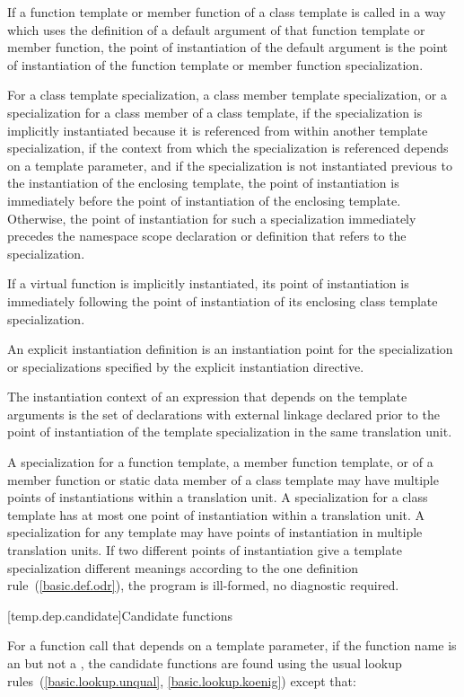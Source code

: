 \pnum
If a function template or member function of a class template is called
in a way which uses the definition of a default argument of that function
template or member function,
the point of instantiation of the default argument is the point of
instantiation of the function template or member function specialization.

\pnum
For a class template specialization, a class member template specialization,
or a specialization for a class member of a class template,
if the specialization is implicitly instantiated because it is referenced
from within another template specialization,
if the context from which the specialization is referenced depends on a
template parameter,
and if the specialization is not instantiated previous to the instantiation of
the enclosing template,
the point of instantiation is immediately before the point of instantiation of
the enclosing template.
Otherwise, the point of instantiation for such a specialization immediately
precedes the namespace scope declaration
or definition that refers to the specialization.

\pnum
If a virtual function is implicitly instantiated, its point of instantiation
is immediately following the point of instantiation of its enclosing class
template specialization.

\pnum
An explicit instantiation definition is an instantiation
point for the specialization or specializations specified by the explicit
instantiation directive.

\pnum
The instantiation context of an expression that depends on the template
arguments is the set of declarations with external linkage declared prior to the
point of instantiation of the template specialization in the same translation
unit.

\pnum
A specialization for a function template, a member function template,
or of a member function or static data member of a class template may have
multiple points of instantiations within a translation unit.
A specialization for a class template has at most one point of instantiation
within a translation unit.
A specialization for any template may have points of instantiation in multiple
translation units.
If two different points of instantiation give a template specialization
different meanings according to the one definition rule~(\ref{basic.def.odr}),
the program is ill-formed, no diagnostic required.

[temp.dep.candidate]{Candidate functions}

\pnum
{}%
For a function call that depends on a template parameter,
if the function name is an  but not a
, the candidate functions are found using the
usual lookup rules~(\ref{basic.lookup.unqual}, \ref{basic.lookup.koenig})
except that:

